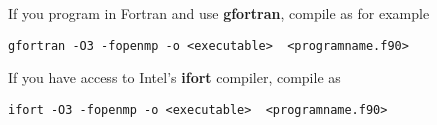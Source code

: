 \documentclass[10pt,showpacs,preprintnumbers,footinbib,amsmath,amssymb,aps,prl,twocolumn,groupedaddress,superscriptaddress,showkeys]{revtex4-1}
\begin{document}
If you program in Fortran and use \textbf{gfortran}, compile as for example
\begin{verbatim}
gfortran -O3 -fopenmp -o <executable>  <programname.f90>
\end{verbatim}
If you have access to Intel's \textbf{ifort} compiler, compile as 
\begin{verbatim}
ifort -O3 -fopenmp -o <executable>  <programname.f90>
\end{verbatim}










\end{document}
